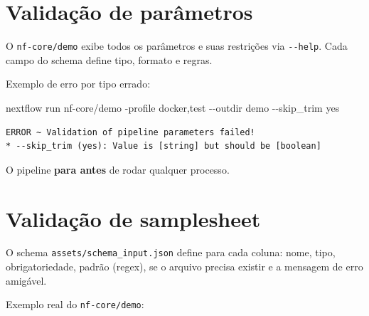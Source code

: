\documentclass[
  brazilian,
  letterpaper,
  DIV=11,
  numbers=noendperiod]{scrreprt}
\newenvironment{Shaded}{\begin{snugshade}}{\end{snugshade}}
\newcommand{\AttributeTok}[1]{\textcolor[rgb]{0.40,0.45,0.13}{#1}}
\newcommand{\ExtensionTok}[1]{\textcolor[rgb]{0.00,0.23,0.31}{#1}}
\newcommand{\NormalTok}[1]{\textcolor[rgb]{0.00,0.23,0.31}{#1}}
\begin{document}
\section{Validação de
parâmetros}\label{validauxe7uxe3o-de-paruxe2metros}

O \texttt{nf-core/demo} exibe todos os parâmetros e suas restrições via
\texttt{-\/-help}. Cada campo do schema define tipo, formato e regras.

Exemplo de erro por tipo errado:

\begin{Shaded}
\begin{Highlighting}[]
\ExtensionTok{nextflow}\NormalTok{ run nf{-}core/demo }\AttributeTok{{-}profile}\NormalTok{ docker,test }\AttributeTok{{-}{-}outdir}\NormalTok{ demo }\AttributeTok{{-}{-}skip\_trim}\NormalTok{ yes}
\end{Highlighting}
\end{Shaded}

\begin{verbatim}
ERROR ~ Validation of pipeline parameters failed!
* --skip_trim (yes): Value is [string] but should be [boolean]
\end{verbatim}

O pipeline \textbf{para antes} de rodar qualquer processo.

\section{Validação de samplesheet}\label{validauxe7uxe3o-de-samplesheet}

O schema \texttt{assets/schema\_input.json} define para cada coluna:
nome, tipo, obrigatoriedade, padrão (regex), se o arquivo precisa
existir e a mensagem de erro amigável.

Exemplo real do \texttt{nf-core/demo}:
\end{document}
